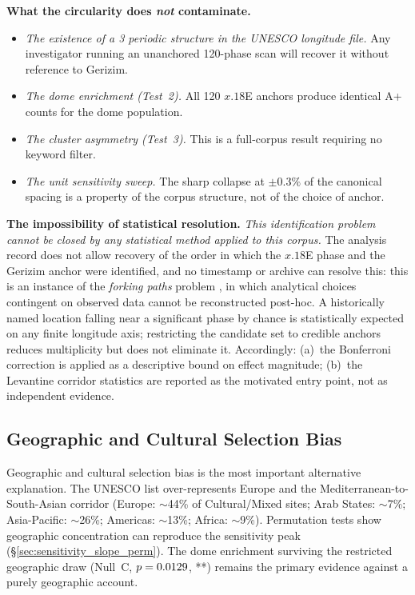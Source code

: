 \documentclass[HARVARD,twocolumn]{USG}
\begin{document}
\textbf{What the circularity does \emph{not} contaminate.}
\begin{itemize}
  \item \emph{The existence of a 3\textdegree{} periodic structure in the
    UNESCO longitude file.}
    Any investigator running an unanchored 120-phase scan will recover it
    without reference to Gerizim.
  \item \emph{The dome enrichment (Test~2).}
    All 120 $x.18$\textdegree{}E anchors produce identical A+ counts for
    the dome population.
  \item \emph{The cluster asymmetry (Test~3).}
    This is a full-corpus result requiring no keyword filter.
  \item \emph{The unit sensitivity sweep.}
    The sharp collapse at $\pm 0.3\%$ of the canonical spacing is a
    property of the corpus structure, not of the choice of anchor.
\end{itemize}

\textbf{The impossibility of statistical resolution.}
\emph{This identification problem cannot be closed by any statistical
method applied to this corpus.}
The analysis record does not allow recovery of the order in which the
$x.18$\textdegree{}E phase and the Gerizim anchor were identified,
and no timestamp or archive can resolve this: this is an instance of the
\emph{forking paths} problem \citep{gelman2014forking}, in which
analytical choices contingent on observed data cannot be reconstructed
post-hoc. A historically named location falling near a significant phase
by chance is statistically expected on any finite longitude axis;
restricting the candidate set to credible anchors reduces multiplicity
but does not eliminate it.
Accordingly: (a)~the Bonferroni correction is applied as a descriptive bound on effect
magnitude; (b)~the Levantine corridor statistics are reported as the
motivated entry point, not as independent evidence.

\subsection{Geographic and Cultural Selection Bias}

Geographic and cultural selection bias is the most important alternative
explanation. The UNESCO list over-represents Europe and the
Mediterranean-to-South-Asian corridor
(Europe: $\sim$44\% of Cultural/Mixed sites; Arab States: $\sim$7\%;
Asia-Pacific: $\sim$26\%; Americas: $\sim$13\%; Africa: $\sim$9\%).
Permutation tests show geographic concentration can reproduce the
sensitivity peak (\S\ref{sec:sensitivity_slope_perm}). The dome
enrichment surviving the restricted geographic draw (Null~C,
$p = 0.0129$, **) remains the primary evidence against
a purely geographic account.
\end{document}
